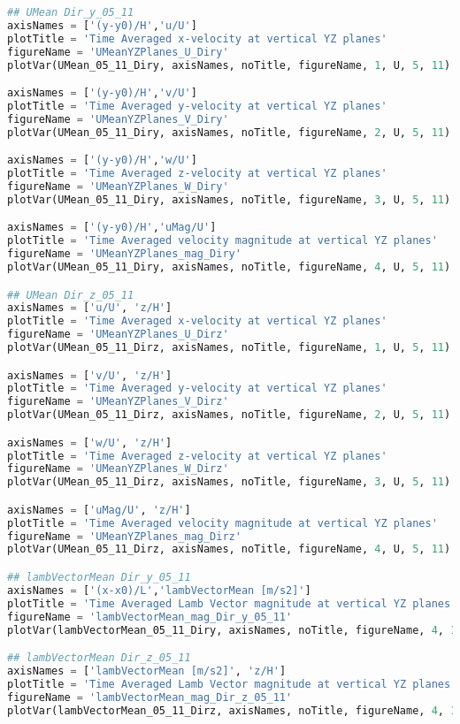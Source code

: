 \begin{lstlisting}[language=python]
## UMean Dir_y_05_11
axisNames = ['(y-y0)/H','u/U']
plotTitle = 'Time Averaged x-velocity at vertical YZ planes'
figureName = 'UMeanYZPlanes_U_Diry'
plotVar(UMean_05_11_Diry, axisNames, noTitle, figureName, 1, U, 5, 11)

axisNames = ['(y-y0)/H','v/U']
plotTitle = 'Time Averaged y-velocity at vertical YZ planes'
figureName = 'UMeanYZPlanes_V_Diry'
plotVar(UMean_05_11_Diry, axisNames, noTitle, figureName, 2, U, 5, 11)

axisNames = ['(y-y0)/H','w/U']
plotTitle = 'Time Averaged z-velocity at vertical YZ planes'
figureName = 'UMeanYZPlanes_W_Diry'
plotVar(UMean_05_11_Diry, axisNames, noTitle, figureName, 3, U, 5, 11)

axisNames = ['(y-y0)/H','uMag/U']
plotTitle = 'Time Averaged velocity magnitude at vertical YZ planes'
figureName = 'UMeanYZPlanes_mag_Diry'
plotVar(UMean_05_11_Diry, axisNames, noTitle, figureName, 4, U, 5, 11)

## UMean Dir_z_05_11
axisNames = ['u/U', 'z/H']
plotTitle = 'Time Averaged x-velocity at vertical YZ planes'
figureName = 'UMeanYZPlanes_U_Dirz'
plotVar(UMean_05_11_Dirz, axisNames, noTitle, figureName, 1, U, 5, 11)

axisNames = ['v/U', 'z/H']
plotTitle = 'Time Averaged y-velocity at vertical YZ planes'
figureName = 'UMeanYZPlanes_V_Dirz'
plotVar(UMean_05_11_Dirz, axisNames, noTitle, figureName, 2, U, 5, 11)

axisNames = ['w/U', 'z/H']
plotTitle = 'Time Averaged z-velocity at vertical YZ planes'
figureName = 'UMeanYZPlanes_W_Dirz'
plotVar(UMean_05_11_Dirz, axisNames, noTitle, figureName, 3, U, 5, 11)

axisNames = ['uMag/U', 'z/H']
plotTitle = 'Time Averaged velocity magnitude at vertical YZ planes'
figureName = 'UMeanYZPlanes_mag_Dirz'
plotVar(UMean_05_11_Dirz, axisNames, noTitle, figureName, 4, U, 5, 11)

## lambVectorMean Dir_y_05_11
axisNames = ['(x-x0)/L','lambVectorMean [m/s2]']
plotTitle = 'Time Averaged Lamb Vector magnitude at vertical YZ planes'
figureName = 'lambVectorMean_mag_Dir_y_05_11'
plotVar(lambVectorMean_05_11_Diry, axisNames, noTitle, figureName, 4, 1, 5, 11)

## lambVectorMean Dir_z_05_11
axisNames = ['lambVectorMean [m/s2]', 'z/H']
plotTitle = 'Time Averaged Lamb Vector magnitude at vertical YZ planes'
figureName = 'lambVectorMean_mag_Dir_z_05_11'
plotVar(lambVectorMean_05_11_Dirz, axisNames, noTitle, figureName, 4, 1, 5, 11)


\end{lstlisting}
